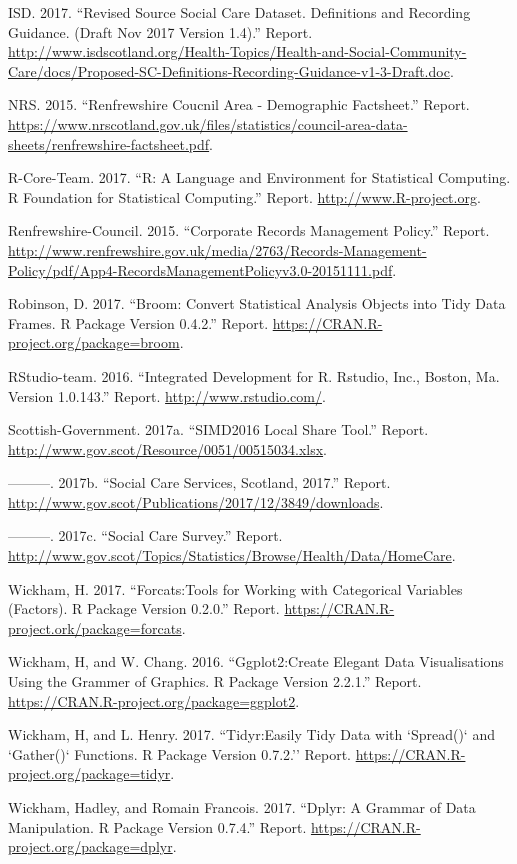 \documentclass[]{article}
\begin{document}
\hypertarget{ref-RN500}{}
ISD. 2017. ``Revised Source Social Care Dataset. Definitions and
Recording Guidance. (Draft Nov 2017 Version 1.4).'' Report.
\url{http://www.isdscotland.org/Health-Topics/Health-and-Social-Community-Care/docs/Proposed-SC-Definitions-Recording-Guidance-v1-3-Draft.doc}.

\hypertarget{ref-RN492}{}
NRS. 2015. ``Renfrewshire Coucnil Area - Demographic Factsheet.''
Report.
\url{https://www.nrscotland.gov.uk/files/statistics/council-area-data-sheets/renfrewshire-factsheet.pdf}.

\hypertarget{ref-RN295}{}
R-Core-Team. 2017. ``R: A Language and Environment for Statistical
Computing. R Foundation for Statistical Computing.'' Report.
\url{http://www.R-project.org}.

\hypertarget{ref-RN495}{}
Renfrewshire-Council. 2015. ``Corporate Records Management Policy.''
Report.
\url{http://www.renfrewshire.gov.uk/media/2763/Records-Management-Policy/pdf/App4-RecordsManagementPolicyv3.0-20151111.pdf}.

\hypertarget{ref-RN520}{}
Robinson, D. 2017. ``Broom: Convert Statistical Analysis Objects into
Tidy Data Frames. R Package Version 0.4.2.'' Report.
\url{https://CRAN.R-project.org/package=broom}.

\hypertarget{ref-RN498}{}
RStudio-team. 2016. ``Integrated Development for R. Rstudio, Inc.,
Boston, Ma. Version 1.0.143.'' Report.
\href{\%20http://www.rstudio.com/}{http://www.rstudio.com/}.

\hypertarget{ref-RN494}{}
Scottish-Government. 2017a. ``SIMD2016 Local Share Tool.'' Report.
\url{http://www.gov.scot/Resource/0051/00515034.xlsx}.

\hypertarget{ref-RN499}{}
---------. 2017b. ``Social Care Services, Scotland, 2017.'' Report.
\url{http://www.gov.scot/Publications/2017/12/3849/downloads}.

\hypertarget{ref-RN487}{}
---------. 2017c. ``Social Care Survey.'' Report.
\url{http://www.gov.scot/Topics/Statistics/Browse/Health/Data/HomeCare}.

\hypertarget{ref-RN521}{}
Wickham, H. 2017. ``Forcats:Tools for Working with Categorical Variables
(Factors). R Package Version 0.2.0.'' Report.
\url{https://CRAN.R-project.ork/package=forcats}.

\hypertarget{ref-RN525}{}
Wickham, H, and W. Chang. 2016. ``Ggplot2:Create Elegant Data
Visualisations Using the Grammer of Graphics. R Package Version 2.2.1.''
Report. \url{https://CRAN.R-project.org/package=ggplot2}.

\hypertarget{ref-RN524}{}
Wickham, H, and L. Henry. 2017. ``Tidyr:Easily Tidy Data with `Spread()`
and `Gather()` Functions. R Package Version 0.7.2.'' Report.
\url{https://CRAN.R-project.org/package=tidyr}.

\hypertarget{ref-RN283}{}
Wickham, Hadley, and Romain Francois. 2017. ``Dplyr: A Grammar of Data
Manipulation. R Package Version 0.7.4.'' Report.
\url{https://CRAN.R-project.org/package=dplyr}.
\end{document}
